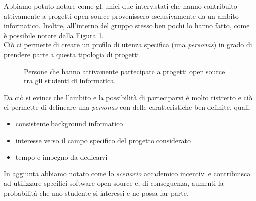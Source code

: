\documentclass[12pt]{article} %
\begin{document}
Abbiamo potuto notare come gli unici due intervistati che hanno contribuito attivamente a progetti open source provenissero esclusivamente da un ambito informatico. Inoltre, all'interno del gruppo stesso ben pochi lo hanno fatto, come è possibile notare dalla Figura \ref{fig:distribuzioneInformatica}.\\
Ciò ci permette di creare un profilo di utenza specifica (una \emph{personas}) in grado di prendere parte a questa tipologia di progetti. 

\begin{figure}[H] 
\caption{Persone che hanno attivamente partecipato a progetti open source tra gli studenti di informatica.}
\label{fig:distribuzioneInformatica}
\end{figure}

Da ciò si evince che l'ambito e la possibilità di parteciparvi è molto ristretto e ciò ci permette di delineare una \emph{personas} con delle caratteristiche ben definite, quali:
\begin{itemize}
\item consistente background informatico
\item interesse verso il campo specifico del progetto considerato
\item tempo e impegno da dedicarvi
\end{itemize}

In aggiunta abbiamo notato come lo \emph{scenario} accademico incentivi e contribuisca ad utilizzare specifici software open source e, di conseguenza, aumenti la probabilità che uno studente si interessi e ne possa far parte. 
\newpage
\end{document}
